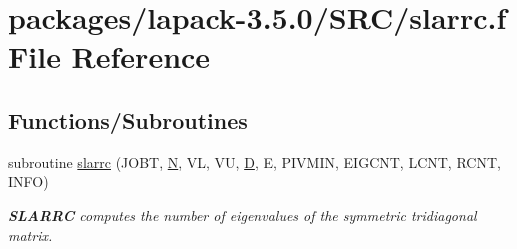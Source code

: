 \hypertarget{slarrc_8f}{}\section{packages/lapack-\/3.5.0/\+S\+R\+C/slarrc.f File Reference}
\label{slarrc_8f}
\subsection*{Functions/\+Subroutines}
\begin{DoxyCompactItemize}
\item 
subroutine \hyperlink{group__auxOTHERauxiliary_ga3895a010b624d4185e3c0c60b3cf1196}{slarrc} (J\+O\+B\+T, \hyperlink{polmisc_8c_a0240ac851181b84ac374872dc5434ee4}{N}, V\+L, V\+U, \hyperlink{odrpack_8h_a7dae6ea403d00f3687f24a874e67d139}{D}, E, P\+I\+V\+M\+I\+N, E\+I\+G\+C\+N\+T, L\+C\+N\+T, R\+C\+N\+T, I\+N\+F\+O)
\begin{DoxyCompactList}\small\item\em {\bfseries S\+L\+A\+R\+R\+C} computes the number of eigenvalues of the symmetric tridiagonal matrix. \end{DoxyCompactList}\end{DoxyCompactItemize}
